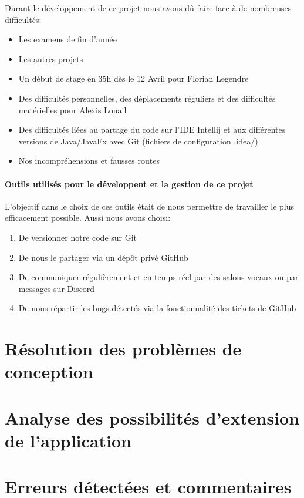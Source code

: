 \documentclass[./standalone.tex]{subfiles}
\begin{document}
Durant le développement de ce projet nous avons dû faire face à de nombreuses difficultés:
\begin{itemize}
	\item Les examens de fin d'année
	\item Les autres projets
	\item Un début de stage en 35h dès le 12 Avril pour Florian Legendre
	\item Des difficultés personnelles, des déplacements réguliers et des difficultés matérielles pour Alexis Louail
	\item Des difficultés liées au partage du code sur l'IDE Intellij et aux différentes versions de Java/JavaFx avec Git (fichiers de configuration .idea/)
	\item Nos incompréhensions et fausses routes\\
\end{itemize}

\paragraph{Outils utilisés pour le développent et la gestion de ce projet\\}
L'objectif dans le choix de ces outils était de nous permettre de travailler le plus efficacement possible. Aussi nous avons choisi:
\begin{enumerate}
	\item De versionner notre code sur Git
	\item De nous le partager via un dépôt privé GitHub
	\item De communiquer régulièrement et en temps réel par des salons vocaux ou par messages sur Discord
	\item De nous répartir les bugs détectés via la fonctionnalité des tickets de GitHub
\end{enumerate}


\section{Résolution des problèmes de conception}


\newpage

\section{Analyse des possibilités d’extension de l’application}



\newpage

\section{Erreurs détectées et commentaires}


\newpage
\end{document}
